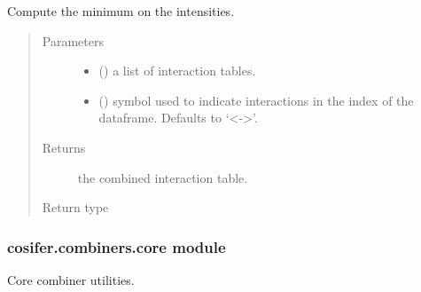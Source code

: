 \documentclass[letterpaper,10pt,english]{sphinxmanual}
\begin{document}
\begin{fulllineitems}
\label{\detokenize{_modules/cosifer.combiners:cosifer.combiners.cit.min_table}}
Compute the minimum on the intensities.
\begin{quote}\begin{description}
\item[{Parameters}] \leavevmode\begin{itemize}
\item {} 
 () \textendash{} a list of interaction tables.

\item {} 
 (\sphinxstyleliteralemphasis{\sphinxupquote{, }}) \textendash{} symbol used to indicate
interactions in the index of the dataframe. Defaults to ‘\textless{}-\textgreater{}’.

\end{itemize}

\item[{Returns}] \leavevmode
the combined interaction table.

\item[{Return type}] \leavevmode
{\hyperref[\detokenize{_modules/cosifer.collections:cosifer.collections.interaction_table.InteractionTable}]{}}

\end{description}\end{quote}

\end{fulllineitems}



\subsubsection{cosifer.combiners.core module}
\label{\detokenize{_modules/cosifer.combiners:module-cosifer.combiners.core}}\label{\detokenize{_modules/cosifer.combiners:cosifer-combiners-core-module}}
Core combiner utilities.
\end{document}
